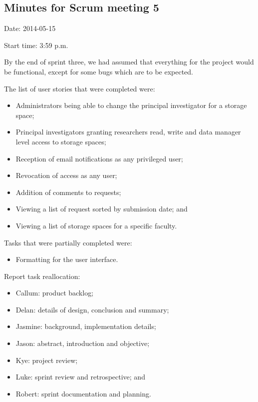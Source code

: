 \documentclass[a4paper,titlepage,12pt]{article}
\begin{document}
\subsection{Minutes for Scrum meeting 5}

Date: 2014-05-15

Start time: 3:59 p.m.

By the end of sprint three, we had assumed that everything for the project
would be functional, except for some bugs which are to be expected.

The list of user stories that were completed were:

\begin{itemize}
	\item Administrators being able to change the principal investigator
	      for a storage space;
	\item Principal investigators granting researchers read, write and data
	      manager level access to storage spaces;
	\item Reception of email notifications as any privileged user;
	\item Revocation of access as any user;
	\item Addition of comments to requests;
	\item Viewing a list of request sorted by submission date; and
	\item Viewing a list of storage spaces for a specific faculty.
\end{itemize}

Tasks that were partially completed were:

\begin{itemize}
	\item Formatting for the user interface.
\end{itemize}

Report task reallocation:

\begin{itemize}
	\item Callum: product backlog;
	\item Delan: details of design, conclusion and summary;
	\item Jasmine: background, implementation details;
	\item Jason: abstract, introduction and objective;
	\item Kye: project review;
	\item Luke: sprint review and retrospective; and
	\item Robert: sprint documentation and planning.
\end{itemize}
\end{document}
